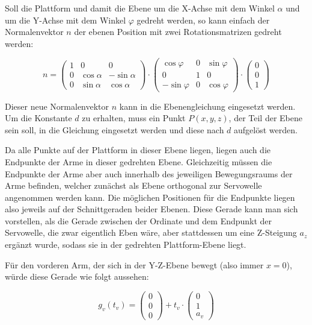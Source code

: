 \documentclass[11pt, a4paper]{scrreprt}
\begin{document}
Soll die Plattform und damit die Ebene um die X-Achse mit dem Winkel $\alpha$ und um die Y-Achse mit
dem Winkel $\varphi$ gedreht werden, so kann einfach der Normalenvektor $n$ der ebenen Position mit zwei
Rotationsmatrizen gedreht werden:

\[
  n =
  \begin{pmatrix} 1 & 0 & 0 \\ 0 & \cos\alpha & -\sin\alpha \\ 0 & \sin\alpha & \cos\alpha \end{pmatrix}
  \cdot
  \begin{pmatrix} \cos\varphi & 0 & \sin\varphi \\ 0 & 1 & 0 \\ -\sin\varphi & 0 & \cos\varphi \end{pmatrix}
  \cdot
  \begin{pmatrix} 0 \\ 0 \\ 1 \end{pmatrix}
\]

Dieser neue Normalenvektor $n$ kann in die Ebenengleichung eingesetzt werden. Um die Konstante
$d$ zu erhalten, muss ein Punkt $P(x, y, z)$, der Teil der Ebene sein soll, in die Gleichung eingesetzt
werden und diese nach $d$ aufgelöst werden.

Da alle Punkte auf der Plattform in dieser Ebene liegen, liegen auch die Endpunkte der Arme in
dieser gedrehten Ebene. Gleichzeitig müssen die Endpunkte der Arme aber auch innerhalb des
jeweiligen Bewegungsraums der Arme befinden, welcher zunächst als Ebene orthogonal zur
Servowelle angenommen werden kann. Die möglichen Positionen für die Endpunkte liegen also
jeweils auf der Schnittgeraden beider Ebenen. Diese Gerade kann man sich vorstellen, als die
Gerade zwischen der Ordinate und dem Endpunkt der Servowelle, die zwar eigentlich Eben wäre,
aber stattdessen um eine Z-Steigung $a_z$ ergänzt wurde, sodass sie in der gedrehten Plattform-Ebene liegt.

Für den vorderen Arm, der sich in der Y-Z-Ebene bewegt (also immer $x = 0$), würde diese Gerade
wie folgt aussehen:

\[
  g_v(t_v) = \begin{pmatrix} 0 \\ 0 \\ 0 \end{pmatrix} + t_v \cdot \begin{pmatrix} 0 \\ 1 \\ a_v \end{pmatrix}
\]
\end{document}
